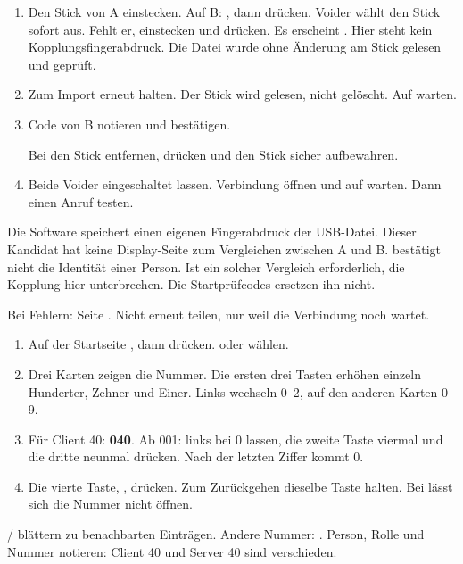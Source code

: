 \begin{enumerate}
\item Den Stick von A einstecken. Auf B: , dann  drücken. Voider wählt den Stick sofort aus. Fehlt er, einstecken und  drücken. Es erscheint . Hier steht kein Kopplungsfingerabdruck. Die Datei wurde ohne Änderung am Stick gelesen und geprüft.
\item Zum Import erneut  halten. Der Stick wird gelesen, nicht gelöscht. Auf  warten.
\item Code von B notieren und bestätigen.\par Bei  den Stick entfernen,  drücken und den Stick sicher aufbewahren.
\item Beide Voider eingeschaltet lassen. Verbindung öffnen und auf  warten. Dann einen Anruf testen.
\end{enumerate}
Die Software speichert einen eigenen Fingerabdruck der USB-Datei. Dieser Kandidat hat keine Display-Seite zum Vergleichen zwischen A und B.  bestätigt nicht die Identität einer Person. Ist ein solcher Vergleich erforderlich, die Kopplung hier unterbrechen. Die Startprüfcodes ersetzen ihn nicht.

Bei Fehlern: Seite \pageref{de:help}. Nicht erneut teilen, nur weil die Verbindung noch wartet.

\begin{enumerate}
\item Auf der Startseite , dann  drücken.  oder  wählen.
\item Drei Karten zeigen die Nummer. Die ersten drei Tasten erhöhen einzeln Hunderter, Zehner und Einer. Links wechseln 0–2, auf den anderen Karten 0–9.
\item Für Client 40: \textbf{040}. Ab 001: links bei 0 lassen, die zweite Taste viermal und die dritte neunmal drücken. Nach der letzten Ziffer kommt 0.
\item Die vierte Taste, , drücken. Zum Zurückgehen dieselbe Taste halten. Bei  lässt sich die Nummer nicht öffnen.
\end{enumerate}
/ blättern zu benachbarten Einträgen. Andere Nummer:  \arr {}. Person, Rolle und Nummer notieren: Client 40 und Server 40 sind verschieden.

